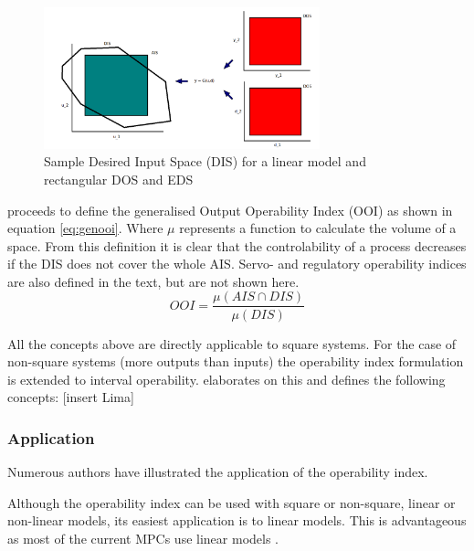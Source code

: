 \begin{figure}[htbp]
  \centering
  \includegraphics[width=8cm]{graph/sample_dis}
  \caption[Sample Desired Input Space]{Sample Desired Input Space (DIS) for
    a linear model and rectangular DOS and EDS}
  \label{fig:sampledis}
\end{figure}

\citet{vinsonphd} proceeds to define the generalised Output Operability Index
(OOI) as shown in equation \ref{eq:genooi}. Where $\mu$ represents a function
to calculate the volume of a space. From this definition it is clear that the
controlability of a process decreases if the DIS does not cover the whole AIS.
Servo- and regulatory operability indices are also defined in the text, but 
are not shown here.
\begin{equation}
  \label{eq:genooi}
     OOI = \frac{\mu(AIS\cap DIS)}{\mu(DIS)}
\end{equation}

All the concepts above are directly applicable to square systems. For the case
of non-square systems (more outputs than inputs) the operability index
formulation is extended to interval operability. \citet{limaphd} elaborates
on this and defines the following concepts:
[insert Lima]

\subsubsection{Application}
Numerous authors have illustrated the application of the operability index.

Although the  operability index can be used with square or non-square, linear
or non-linear models, its easiest application is to linear models. This is
advantageous as most of the current MPCs use linear models \citep{vinsonphd}.

